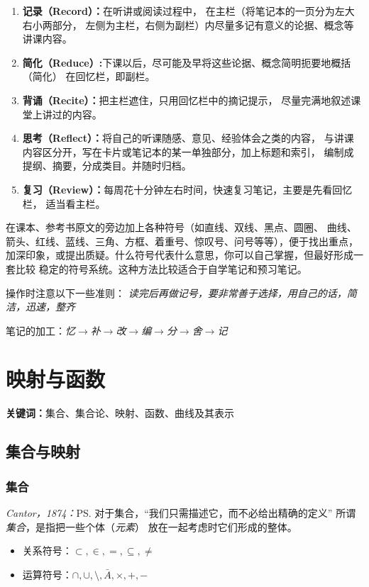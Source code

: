 \begin{shaded}
\begin{center}
	\end{center}
	
	\begin{enumerate}[Step1]
	  \item {\bf 记录（Record）：}在听讲或阅读过程中，
	  在主栏（将笔记本的一页分为左大右小两部分，
	  左侧为主栏，右侧为副栏）内尽量多记有意义的论据、概念等讲课内容。
	  \item {\bf 简化（Reduce）:}下课以后，尽可能及早将这些论据、概念简明扼要地概括（简化）
	  在回忆栏，即副栏。
	  \item {\bf 背诵（Recite）：}把主栏遮住，只用回忆栏中的摘记提示，
	  尽量完满地叙述课堂上讲过的内容。
	  \item {\bf 思考（Reflect）：}将自己的听课随感、意见、经验体会之类的内容，
	  与讲课内容区分开，写在卡片或笔记本的某一单独部分，加上标题和索引，
	  编制成提纲、摘要，分成类目。并随时归档。
	  \item {\bf 复习（Review）：}每周花十分钟左右时间，快速复习笔记，主要是先看回忆栏，
	  适当看主栏。
	\end{enumerate}
	
	在课本、参考书原文的旁边加上各种符号（如直线、双线、黑点、圆圈、
	曲线、箭头、红线、蓝线、三角、方框、着重号、惊叹号、问号等等），便于找出重点，
	加深印象，或提出质疑。什么符号代表什么意思，你可以自己掌握，但最好形成一套比较
	稳定的符号系统。这种方法比较适合于自学笔记和预习笔记。
	
	操作时注意以下一些准则：
	{\it 读完后再做记号，要非常善于选择，用自己的话，简洁，迅速，整齐}
	
	笔记的加工：{\it 忆$\to$补$\to$改$\to$编$\to$分$\to$舍$\to$记}	
\end{shaded}

\chapter{映射与函数}

{\bf 关键词：}集合、集合论、映射、函数、曲线及其表示

\section{集合与映射}

\subsection{集合}

{\it Cantor，1874：}\ps{对于集合，“我们只需描述它，而不必给出精确的定义”}
所谓{\it 集合}，是指把一些个体（{\it 元素}） 放在一起考虑时它们形成的整体。
\begin{itemize}
  \item 关系符号：$\subset, \in, =, \subseteq, \neq$
  \item 运算符号：$\cap,\cup, \setminus, \bar{A}, \times, +, - $
\end{itemize}
	

